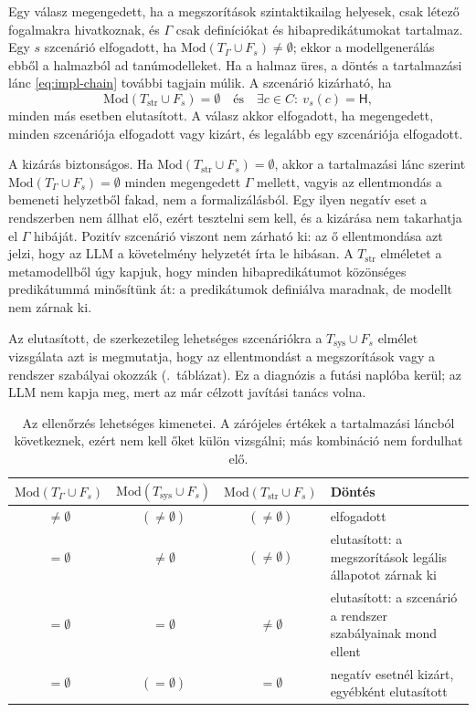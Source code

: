 Egy válasz megengedett, ha a megszorítások szintaktikailag helyesek, csak létező fogalmakra hivatkoznak, és $\Gamma$ csak definíciókat és hibapredikátumokat tartalmaz. Egy $s$ szcenárió elfogadott, ha $\mathrm{Mod}(T_\Gamma \cup F_s) \neq \emptyset$; ekkor a modellgenerálás ebből a halmazból ad tanúmodelleket. Ha a halmaz üres, a döntés a tartalmazási lánc \eqref{eq:impl-chain} további tagjain múlik. A szcenárió kizárható, ha
\begin{equation}
\mathrm{Mod}(T_{\mathrm{str}} \cup F_s) = \emptyset \quad \text{és} \quad \exists c \in C\colon\ v_s(c) = \mathsf{H}, \label{eq:impl-exclude}
\end{equation}
minden más esetben elutasított. A válasz akkor elfogadott, ha megengedett, minden szcenáriója elfogadott vagy kizárt, és legalább egy szcenáriója elfogadott.

A kizárás biztonságos. Ha $\mathrm{Mod}(T_{\mathrm{str}} \cup F_s) = \emptyset$, akkor a tartalmazási lánc szerint $\mathrm{Mod}(T_\Gamma \cup F_s) = \emptyset$ minden megengedett $\Gamma$ mellett, vagyis az ellentmondás a bemeneti helyzetből fakad, nem a formalizálásból. Egy ilyen negatív eset a rendszerben nem állhat elő, ezért tesztelni sem kell, és a kizárása nem takarhatja el $\Gamma$ hibáját. Pozitív szcenárió viszont nem zárható ki: az ő ellentmondása azt jelzi, hogy az LLM a követelmény helyzetét írta le hibásan. A $T_{\mathrm{str}}$ elméletet a metamodellből úgy kapjuk, hogy minden hibapredikátumot közönséges predikátummá minősítünk át: a predikátumok definiálva maradnak, de modellt nem zárnak ki.

Az elutasított, de szerkezetileg lehetséges szcenáriókra a $T_{\mathrm{sys}} \cup F_s$ elmélet vizsgálata azt is megmutatja, hogy az ellentmondást a megszorítások vagy a rendszer szabályai okozzák (.~táblázat). Ez a diagnózis a futási naplóba kerül; az LLM nem kapja meg, mert az már célzott javítási tanács volna.

\begin{table}[!ht]
	\footnotesize
	\centering
	\begin{tabular}{c c c >{\raggedright\arraybackslash}p{}}
		\toprule
		$\mathrm{Mod}(T_\Gamma \cup F_s)$ & $\mathrm{Mod}(T_{\mathrm{sys}} \cup F_s)$ & $\mathrm{Mod}(T_{\mathrm{str}} \cup F_s)$ & Döntés \\
		\midrule
		$\neq \emptyset$ & $(\neq \emptyset)$ & $(\neq \emptyset)$ & elfogadott \\
		$= \emptyset$ & $\neq \emptyset$ & $(\neq \emptyset)$ & elutasított: a megszorítások legális állapotot zárnak ki \\
		$= \emptyset$ & $= \emptyset$ & $\neq \emptyset$ & elutasított: a szcenárió a rendszer szabályainak mond ellent \\
		$= \emptyset$ & $(= \emptyset)$ & $= \emptyset$ & negatív esetnél kizárt, egyébként elutasított \\
		\bottomrule
	\end{tabular}
	\caption{Az ellenőrzés lehetséges kimenetei. A zárójeles értékek a tartalmazási láncból következnek, ezért nem kell őket külön vizsgálni; más kombináció nem fordulhat elő.}
	\label{tab:impl-cases}
\end{table}

